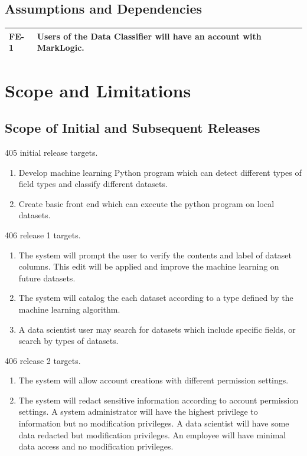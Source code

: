 \documentclass[12pt,oneside,letterpaper]{article}
\begin{document}
\subsection{Assumptions and Dependencies}
\begin{tabular}{|p{1in}p{4.5in}|}
\hline
\textbf{FE-1}&Users of the Data Classifier will have an account with MarkLogic.\\
\hline
\end{tabular}



\newpage
\section{Scope and Limitations}
\subsection{Scope of Initial and Subsequent Releases}
405 initial release targets.
\begin{enumerate}
    \item Develop machine learning Python program which can detect different types of field types and classify different datasets.
    \item Create basic front end which can execute the python program on local datasets.
\end{enumerate}  
406 release 1 targets.
\begin{enumerate}
    \item The system will prompt the user to verify the contents and label of dataset columns. This edit will be applied and improve the machine learning on future datasets.
    \item The system will catalog the each dataset according to a type defined by the machine learning algorithm.
    \item A data scientist user may search for datasets which include specific fields, or search by types of datasets.
\end{enumerate}
406 release 2 targets.
\begin{enumerate}
    \item The system will allow account creations with different permission settings.
    \item The system will redact sensitive information according to account permission settings. A system administrator will have the highest privilege to information but no modification privileges. A data scientist will have some data redacted but modification privileges. An employee will have minimal data access and no modification privileges.
\end{enumerate}
\end{document}

